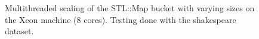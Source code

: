 \begin{landscape}
\begin{figure}[!h]
{        }
        \label{fig:ts_ask_shake_map}
        \caption{Multithreaded scaling of the STL::Map bucket with varying sizes on the
        Xeon machine (8 cores). Testing done with the shakespeare dataset.}
    \end{figure}
    \begin{figure}[!h]
\end{figure}
\end{landscape}
